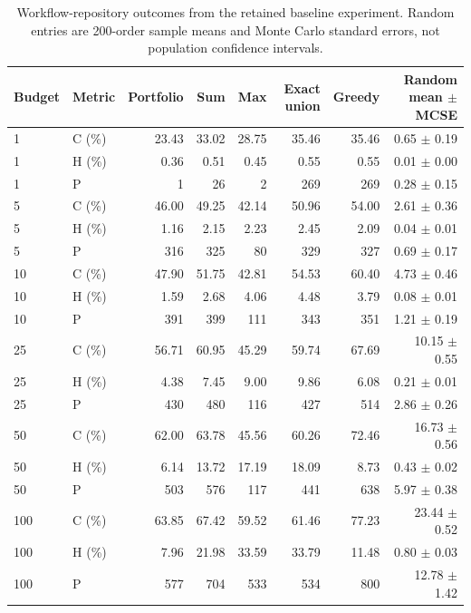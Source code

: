 \begin{table}[t]
\centering
\footnotesize
\caption{Workflow-repository outcomes from the retained baseline experiment. Random entries are 200-order sample means and Monte Carlo standard errors, not population confidence intervals.}
\label{tab:multi_budget_comparison}
\begin{tabular}{llrrrrrr}
\toprule
Budget & Metric & Portfolio & Sum & Max & Exact union & Greedy & Random mean $\pm$ MCSE\\
\midrule
1 & C (\%) & 23.43 & 33.02 & 28.75 & 35.46 & 35.46 & 0.65 $\pm$ 0.19\\
1 & H (\%) & 0.36 & 0.51 & 0.45 & 0.55 & 0.55 & 0.01 $\pm$ 0.00\\
1 & P & 1 & 26 & 2 & 269 & 269 & 0.28 $\pm$ 0.15\\
5 & C (\%) & 46.00 & 49.25 & 42.14 & 50.96 & 54.00 & 2.61 $\pm$ 0.36\\
5 & H (\%) & 1.16 & 2.15 & 2.23 & 2.45 & 2.09 & 0.04 $\pm$ 0.01\\
5 & P & 316 & 325 & 80 & 329 & 327 & 0.69 $\pm$ 0.17\\
10 & C (\%) & 47.90 & 51.75 & 42.81 & 54.53 & 60.40 & 4.73 $\pm$ 0.46\\
10 & H (\%) & 1.59 & 2.68 & 4.06 & 4.48 & 3.79 & 0.08 $\pm$ 0.01\\
10 & P & 391 & 399 & 111 & 343 & 351 & 1.21 $\pm$ 0.19\\
25 & C (\%) & 56.71 & 60.95 & 45.29 & 59.74 & 67.69 & 10.15 $\pm$ 0.55\\
25 & H (\%) & 4.38 & 7.45 & 9.00 & 9.86 & 6.08 & 0.21 $\pm$ 0.01\\
25 & P & 430 & 480 & 116 & 427 & 514 & 2.86 $\pm$ 0.26\\
50 & C (\%) & 62.00 & 63.78 & 45.56 & 60.26 & 72.46 & 16.73 $\pm$ 0.56\\
50 & H (\%) & 6.14 & 13.72 & 17.19 & 18.09 & 8.73 & 0.43 $\pm$ 0.02\\
50 & P & 503 & 576 & 117 & 441 & 638 & 5.97 $\pm$ 0.38\\
100 & C (\%) & 63.85 & 67.42 & 59.52 & 61.46 & 77.23 & 23.44 $\pm$ 0.52\\
100 & H (\%) & 7.96 & 21.98 & 33.59 & 33.79 & 11.48 & 0.80 $\pm$ 0.03\\
100 & P & 577 & 704 & 533 & 534 & 800 & 12.78 $\pm$ 1.42\\
\bottomrule
\end{tabular}
\end{table}
